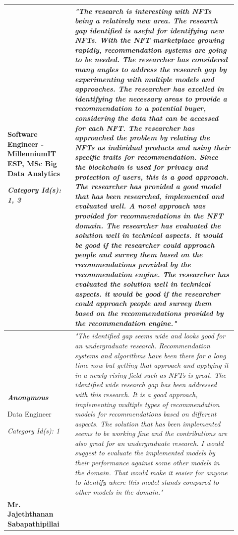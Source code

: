 \begin{longtable}{|p{0.27\linewidth}|p{0.655\linewidth}|}
Software Engineer - MillenniumIT ESP,
MSc Big Data Analytics

\textit{Category Id(s): 1, 3}
 & 
 \textit{"The research is interesting with NFTs being a relatively new area. The research gap identified is useful for identifying new NFTs. With the NFT marketplace growing rapidly, recommendation systems are going to be needed. The researcher has considered many angles to address the research gap by experimenting with multiple models and approaches. The researcher has excelled in identifying the necessary areas to provide a recommendation to a potential buyer, considering the data that can be accessed for each NFT. The researcher has approached the problem by relating the NFTs as individual products and using their specific traits for recommendation. Since the blockchain is used for privacy and protection of users, this is a good approach. The researcher has provided a good model that has been researched, implemented and evaluated well. A novel approach was provided for recommendations in the NFT domain. The researcher has evaluated the solution well in technical aspects. it would be good if the researcher could approach people and survey them based on the recommendations provided by the recommendation engine. The researcher has evaluated the solution well in technical aspects. it would be good if the researcher could approach people and survey them based on the recommendations provided by the recommendation engine."}
 \\
\hline
\textbf{\textit{Anonymous}}

Data Engineer

\textit{Category Id(s): 1}
&
\textit{"The identified gap seems wide and looks good for an undergraduate research. Recommendation systems and algorithms have been there for a long time now but getting that approach and applying it in a newly rising field such as NFTs is great. The identified wide research gap has been addressed with this research. It is a good approach, implementing multiple types of recommendation models for recommendations based on different aspects. The solution that has been implemented seems to be working fine and the contributions are also great for an undergraduate research. I would suggest to evaluate the implemented models by their performance against some other models in the domain. That would make it easier for anyone to identify where this model stands compared to other models in the domain."}
\\
\hline
\textbf{Mr. Jajeththanan Sabapathipillai}


\end{longtable}
